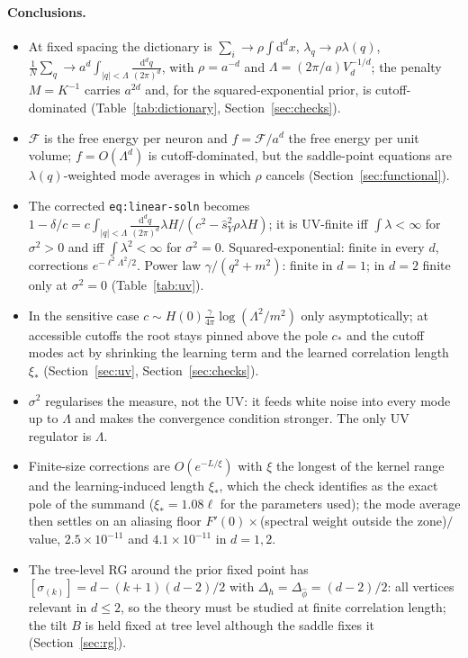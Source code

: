 \documentclass[11pt,a4paper]{article}
\newcommand{\F}{\mathcal F}
\newcommand{\dd}{\mathrm d}
\newcommand{\Lam}{\Lambda}
\newcommand{\sY}{\hat s_Y}
\begin{document}
\paragraph{Conclusions.}
\begin{itemize}
  \item At fixed spacing the dictionary is $\sum_i\to\rho\int\dd^dx$, $\lambda_q\to\rho\lambda(q)$, $\frac1N\sum_q\to a^d\int_{|q|<\Lam}\frac{\dd^dq}{(2\pi)^d}$, with $\rho = a^{-d}$ and $\Lam = (2\pi/a)V_d^{-1/d}$; the penalty $M = K^{-1}$ carries $a^{2d}$ and, for the squared-exponential prior, is cutoff-dominated (Table~\ref{tab:dictionary}, Section~\ref{sec:checks}).
  \item $\F$ is the free energy per neuron and $f = \F/a^d$ the free energy per unit volume; $f = O(\Lam^d)$ is cutoff-dominated, but the saddle-point equations are $\lambda(q)$-weighted mode averages in which $\rho$ cancels (Section~\ref{sec:functional}).
  \item The corrected \texttt{eq:linear-soln} becomes $1-\delta/c = c\int_{|q|<\Lam}\frac{\dd^dq}{(2\pi)^d}\lambda H/(c^2-\sY^2\rho\lambda H)$; it is UV-finite iff $\int\lambda<\infty$ for $\sigma^2>0$ and iff $\int\lambda^2<\infty$ for $\sigma^2 = 0$. Squared-exponential: finite in every $d$, corrections $e^{-\ell^2\Lam^2/2}$. Power law $\gamma/(q^2+m^2)$: finite in $d=1$; in $d=2$ finite only at $\sigma^2 = 0$ (Table~\ref{tab:uv}).
  \item In the sensitive case $c\sim H(0)\frac{\gamma}{4\pi}\log(\Lam^2/m^2)$ only asymptotically; at accessible cutoffs the root stays pinned above the pole $c_*$ and the cutoff modes act by shrinking the learning term and the learned correlation length $\xi_*$ (Section~\ref{sec:uv}, Section~\ref{sec:checks}).
  \item $\sigma^2$ regularises the measure, not the UV: it feeds white noise into every mode up to $\Lam$ and makes the convergence condition stronger. The only UV regulator is $\Lam$.
  \item Finite-size corrections are $O(e^{-L/\xi})$ with $\xi$ the longest of the kernel range and the learning-induced length $\xi_*$, which the check identifies as the exact pole of the summand ($\xi_* = 1.08\ell$ for the parameters used); the mode average then settles on an aliasing floor $F'(0)\times$(spectral weight outside the zone)$/$value, $2.5\times10^{-11}$ and $4.1\times10^{-11}$ in $d = 1, 2$.
  \item The tree-level RG around the prior fixed point has $[\sigma_{(k)}] = d-(k+1)(d-2)/2$ with $\Delta_h = \Delta_{\hat\phi} = (d-2)/2$: all vertices relevant in $d\le2$, so the theory must be studied at finite correlation length; the tilt $B$ is held fixed at tree level although the saddle fixes it (Section~\ref{sec:rg}).
\end{itemize}
\end{document}
